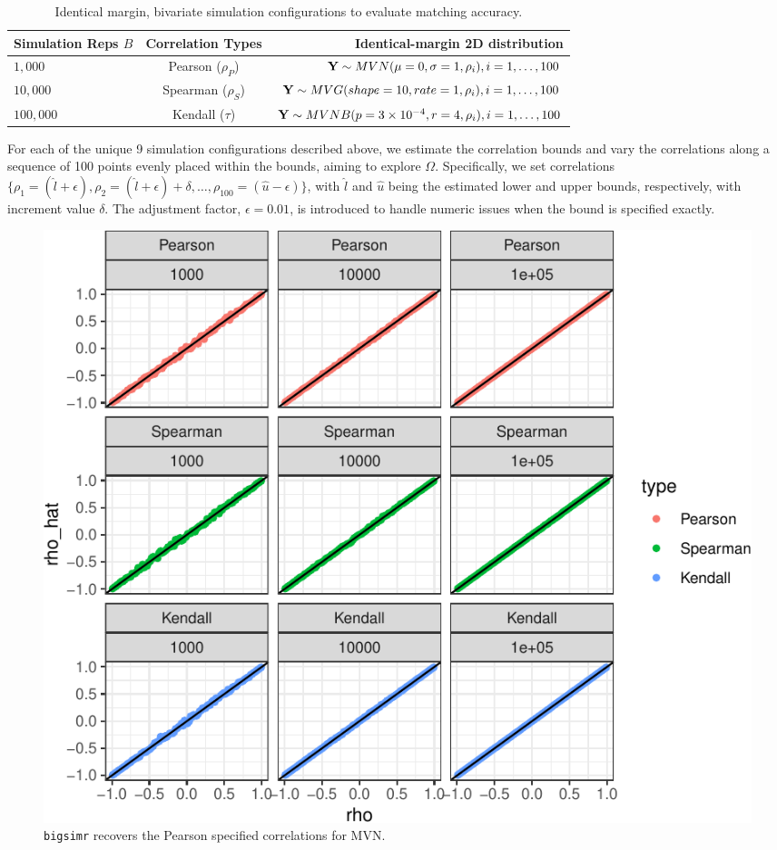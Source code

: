 \documentclass{article}
\begin{document}
\begin{table}[]
\centering
\caption{ \label{tab:sims} Identical margin, bivariate simulation configurations to evaluate matching accuracy.}
\begin{tabular}{@{}lcr@{}}
\toprule
Simulation Reps $B$ & Correlation Types & Identical-margin 2D distribution \\ \midrule
$1,000$ & Pearson ($\rho_P$) & ${\bf Y} \sim MVN( \mu= 0 , \sigma = 1, \rho_i ), i=1,\ldots,100$ \\
$10,000$ & Spearman ($\rho_S$) & ${\bf Y} \sim MVG( shape = 10, rate = 1, \rho_i ), i=1,\ldots,100$ \\
$100,000$ & Kendall ($\tau$) & ${\bf Y} \sim MVNB(p = 3\times10^{-4}, r = 4,\rho_i), i=1,\ldots,100$ \\ \bottomrule
\end{tabular}
\end{table}

For each of the unique 9 simulation configurations described above, we
estimate the correlation bounds and vary the correlations along a
sequence of 100 points evenly placed within the bounds, aiming to
explore \(\Omega\). Specifically, we set correlations
\(\{ \rho_1 = ( \hat{l} + \epsilon), \rho_2 = (\hat{l} + \epsilon) + \delta, \ldots, \rho_{100} = (\hat{u} - \epsilon) \}\),
with \(\hat{l}\) and \(\hat{u}\) being the estimated lower and upper
bounds, respectively, with increment value \(\delta\). The adjustment
factor, \(\epsilon=0.01\), is introduced to handle numeric issues when
the bound is specified exactly.

\begin{figure}
\centering
\includegraphics{ch040-biNormPlot-1.pdf}
\caption{\label{fig:ch040-biNormPlot}\texttt{bigsimr} recovers the
Pearson specified correlations for MVN.}
\end{figure}
\end{document}
